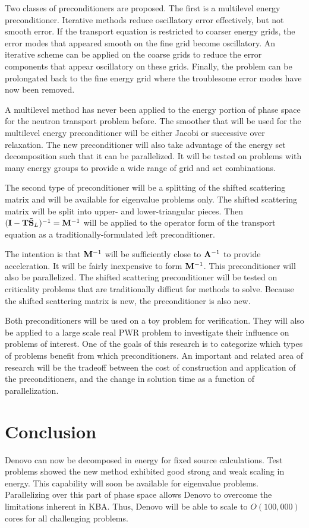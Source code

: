 Two classes of preconditioners are proposed. The first is a multilevel energy preconditioner. Iterative methods reduce oscillatory error effectively, but not smooth error. If the transport equation is restricted to coarser energy grids, the error modes that appeared smooth on the fine grid become oscillatory. An iterative scheme can be applied on the coarse grids to reduce the error components that appear oscillatory on these grids. Finally, the problem can be prolongated back to the fine energy grid where the troublesome error modes have now been removed. 

A multilevel method has never been applied to the energy portion of phase space for the neutron transport problem before. The smoother that will be used for the multilevel energy preconditioner will be either Jacobi or successive over relaxation. The new preconditioner will also take advantage of the energy set decomposition such that it can be parallelized. It will be tested on problems with many energy groups to provide a wide range of grid and set combinations. 

The second type of preconditioner will be a splitting of the shifted scattering matrix and will be available for eigenvalue problems only. The shifted scattering matrix will be split into upper- and lower-triangular pieces. Then $(\mathbf{I} - \mathbf{T\tilde{S}}_L)^{-1} = \mathbf{M}^{-1}$ will be applied to the operator form of the transport equation as a traditionally-formulated left preconditioner. 

The intention is that $\mathbf{M}^{-1}$ will be sufficiently close to $\mathbf{A}^{-1}$ to provide acceleration. It will be fairly inexpensive to form $\mathbf{M}^{-1}$. This preconditioner will also be parallelized. The shifted scattering preconditioner will be tested on criticality problems that are traditionally difficut for \Sn methods to solve. Because the shifted scattering matrix is new, the preconditioner is also  new.

Both preconditioners will be used on a toy problem for verification. They will also be applied to a large scale real PWR problem to investigate their influence on problems of interest. One of the goals of this research is to categorize which types of problems benefit from which preconditioners. An important and related area of research will be the tradeoff between the cost of construction and application of the preconditioners, and the change in solution time as a function of parallelization. 

\section{Conclusion}
Denovo can now be decomposed in energy for fixed source calculations. Test problems showed the new method exhibited good strong and weak scaling in energy. This capability will soon be available for eigenvalue problems. Parallelizing over this part of phase space allows Denovo to overcome the limitations inherent in KBA. Thus, Denovo will be able to scale to $O(100,000)$ cores for all challenging problems. 

